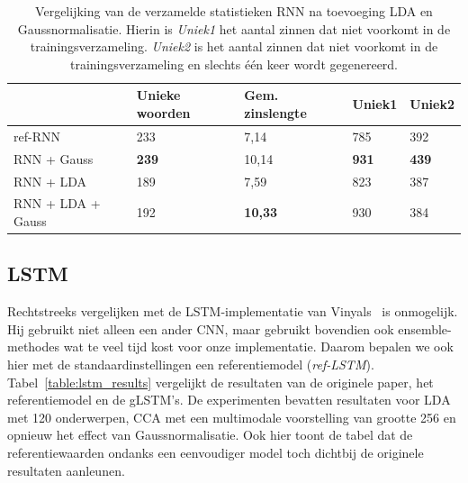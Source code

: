 \begin{table}
	\centering
	\begin{tabular}{lllll}
		~                 & Unieke woorden & Gem. zinslengte & Uniek1 & Uniek2 \\ \hline
		ref-RNN           & 233            & 7,14           & 785    & 392    \\
		RNN + Gauss       & \textbf{239}   & 10,14          & \textbf{931}    & \textbf{439}    \\
		RNN + LDA         & 189            & 7,59           & 823    & 387    \\
		RNN + LDA + Gauss & 192            & \textbf{10,33}          & 930    & 384    \\\hline
	\end{tabular}
	\caption[Vergelijking van de verzamelde statistieken RNN na toevoeging LDA en Gaussnormalisatie]{Vergelijking van de verzamelde statistieken RNN na toevoeging LDA en Gaussnormalisatie. Hierin is \emph{Uniek1} het aantal zinnen dat niet voorkomt in de trainingsverzameling. \emph{Uniek2} is het aantal zinnen dat niet voorkomt in de trainingsverzameling en slechts \'e\'en keer wordt gegenereerd.}
	\label{table:rnn_lda_stats}
\end{table}

\subsection{LSTM}
Rechtstreeks vergelijken met de LSTM-implementatie van Vinyals~\cite{Google} is onmogelijk. Hij gebruikt niet alleen een ander CNN, maar gebruikt bovendien ook ensemble-methodes wat te veel tijd kost voor onze implementatie. Daarom bepalen we ook hier met de standaardinstellingen een referentiemodel (\emph{ref-LSTM}). Tabel~\ref{table:lstm_results} vergelijkt de resultaten van de originele paper, het referentiemodel en de gLSTM's. De experimenten bevatten resultaten voor LDA met 120 onderwerpen, CCA met een multimodale voorstelling van grootte 256 en opnieuw het effect van Gaussnormalisatie. Ook hier toont de tabel dat de referentiewaarden ondanks een eenvoudiger model toch dichtbij de originele resultaten aanleunen. 

